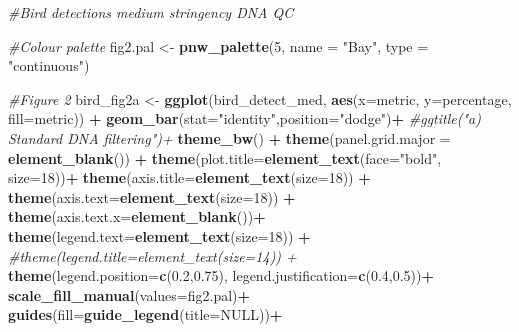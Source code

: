 \documentclass[]{article}
\newenvironment{Shaded}{\begin{snugshade}}{\end{snugshade}}
\newcommand{\KeywordTok}[1]{\textcolor[rgb]{0.13,0.29,0.53}{\textbf{#1}}}
\newcommand{\DataTypeTok}[1]{\textcolor[rgb]{0.13,0.29,0.53}{#1}}
\newcommand{\DecValTok}[1]{\textcolor[rgb]{0.00,0.00,0.81}{#1}}
\newcommand{\FloatTok}[1]{\textcolor[rgb]{0.00,0.00,0.81}{#1}}
\newcommand{\StringTok}[1]{\textcolor[rgb]{0.31,0.60,0.02}{#1}}
\newcommand{\CommentTok}[1]{\textcolor[rgb]{0.56,0.35,0.01}{\textit{#1}}}
\newcommand{\OtherTok}[1]{\textcolor[rgb]{0.56,0.35,0.01}{#1}}
\newcommand{\OperatorTok}[1]{\textcolor[rgb]{0.81,0.36,0.00}{\textbf{#1}}}
\newcommand{\NormalTok}[1]{#1}
\begin{document}
\begin{Shaded}
\begin{Highlighting}[]
\CommentTok{#Bird detections medium stringency DNA QC}

\CommentTok{#Colour palette}
\NormalTok{fig2.pal <-}\StringTok{ }\KeywordTok{pnw_palette}\NormalTok{(}\DecValTok{5}\NormalTok{, }\DataTypeTok{name =} \StringTok{"Bay"}\NormalTok{, }\DataTypeTok{type =} \StringTok{"continuous"}\NormalTok{)}

\CommentTok{#Figure 2}
\NormalTok{bird_fig2a <-}\StringTok{ }\KeywordTok{ggplot}\NormalTok{(bird_detect_med, }\KeywordTok{aes}\NormalTok{(}\DataTypeTok{x=}\NormalTok{metric, }\DataTypeTok{y=}\NormalTok{percentage, }\DataTypeTok{fill=}\NormalTok{metric)) }\OperatorTok{+}
\StringTok{  }\KeywordTok{geom_bar}\NormalTok{(}\DataTypeTok{stat=}\StringTok{"identity"}\NormalTok{,}\DataTypeTok{position=}\StringTok{"dodge"}\NormalTok{)}\OperatorTok{+}
\StringTok{  }\CommentTok{#ggtitle("a) Standard DNA filtering")+}
\StringTok{  }\KeywordTok{theme_bw}\NormalTok{() }\OperatorTok{+}\StringTok{ }\KeywordTok{theme}\NormalTok{(}\DataTypeTok{panel.grid.major =} \KeywordTok{element_blank}\NormalTok{()) }\OperatorTok{+}
\StringTok{  }\KeywordTok{theme}\NormalTok{(}\DataTypeTok{plot.title=}\KeywordTok{element_text}\NormalTok{(}\DataTypeTok{face=}\StringTok{"bold"}\NormalTok{, }\DataTypeTok{size=}\DecValTok{18}\NormalTok{))}\OperatorTok{+}
\StringTok{  }\KeywordTok{theme}\NormalTok{(}\DataTypeTok{axis.title=}\KeywordTok{element_text}\NormalTok{(}\DataTypeTok{size=}\DecValTok{18}\NormalTok{)) }\OperatorTok{+}\StringTok{ }\KeywordTok{theme}\NormalTok{(}\DataTypeTok{axis.text=}\KeywordTok{element_text}\NormalTok{(}\DataTypeTok{size=}\DecValTok{18}\NormalTok{)) }\OperatorTok{+}
\StringTok{  }\KeywordTok{theme}\NormalTok{(}\DataTypeTok{axis.text.x=}\KeywordTok{element_blank}\NormalTok{())}\OperatorTok{+}
\StringTok{  }\KeywordTok{theme}\NormalTok{(}\DataTypeTok{legend.text=}\KeywordTok{element_text}\NormalTok{(}\DataTypeTok{size=}\DecValTok{18}\NormalTok{)) }\OperatorTok{+}\StringTok{ }\CommentTok{#theme(legend.title=element_text(size=14)) +}
\StringTok{  }\KeywordTok{theme}\NormalTok{(}\DataTypeTok{legend.position=}\KeywordTok{c}\NormalTok{(}\FloatTok{0.2}\NormalTok{,}\FloatTok{0.75}\NormalTok{), }\DataTypeTok{legend.justification=}\KeywordTok{c}\NormalTok{(}\FloatTok{0.4}\NormalTok{,}\FloatTok{0.5}\NormalTok{))}\OperatorTok{+}
\StringTok{  }\KeywordTok{scale_fill_manual}\NormalTok{(}\DataTypeTok{values=}\NormalTok{fig2.pal)}\OperatorTok{+}
\StringTok{  }\KeywordTok{guides}\NormalTok{(}\DataTypeTok{fill=}\KeywordTok{guide_legend}\NormalTok{(}\DataTypeTok{title=}\OtherTok{NULL}\NormalTok{))}\OperatorTok{+}

\end{Highlighting}
\end{Shaded}
\end{document}
